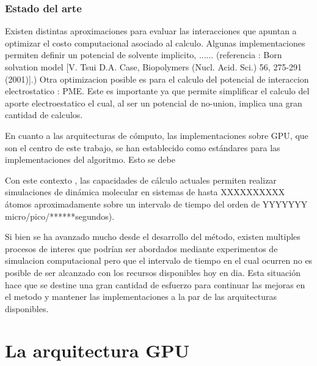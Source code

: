 \documentclass[a4paper,10pt]{report}
\begin{document}
\subsection{Estado del arte}


Existen distintas aproximaciones para evaluar las interacciones que apuntan a optimizar el costo computacional asociado al calculo. Algunas implementaciones permiten definir un potencial de solvente implicito, ...... (referencia : Born solvation model [V. Tsui  D.A. Case, Biopolymers (Nucl. Acid. Sci.) 56, 275-291 (2001)].)
Otra optimizacion posible es para el calculo del potencial de interaccion electrostatico : PME. Este es importante ya que permite simplificar el calculo del aporte electroestatico el cual, al ser un potencial de no-union, implica una gran cantidad de calculos.






En cuanto a las arquitecturas de cómputo, las implementaciones sobre GPU, que son el centro de este trabajo, se han establecido como estándares para las implementaciones del algoritmo. Esto se debe 


Con este contexto , las capacidades de cálculo actuales permiten realizar simulaciones de dinámica molecular en sistemas de hasta XXXXXXXXXX átomos aproximadamente sobre un intervalo de tiempo del orden de YYYYYYY  micro/pico/******segundos).

Si bien se ha avanzado mucho desde el desarrollo del método, existen multiples procesos de interes que podrían ser abordados mediante experimentos de simulacion computacional pero que el intervalo de tiempo en el cual ocurren no es posible de ser alcanzado con los recursos disponibles hoy en dia.
Esta situación hace que se destine una gran cantidad de esfuerzo para continuar las mejoras en el metodo y mantener las implementaciones a la par de las arquitecturas disponibles.





\chapter{La arquitectura GPU}
\end{document}
